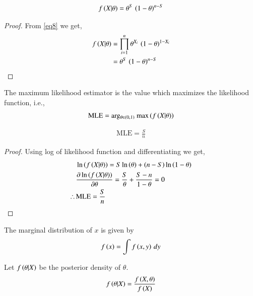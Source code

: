 \documentclass[journal,12pt,twocolumn]{IEEEtran}
\begin{document}
\begin{lemma}
\begin{align}
    f\left(X|\theta\right)=\theta^S\,\left(1-\theta\right)^{n-S}\label{eq7}
\end{align}
\end{lemma}

\begin{proof}
From \eqref{eq8} we get,
\begin{align}
    f\left(X|\theta\right) &= \prod_{i=1}^n\theta^{X_i}\,\left(1-\theta\right)^{1-X_i}\nonumber\\
    &=\theta^S\,\left(1-\theta\right)^{n-S}
\end{align}
\end{proof}

\begin{definition}
The maximum likelihood estimator is the value which maximizes the likelihood function, i.e.,
\begin{align}
    \text{MLE} = \text{arg$_{\theta \in (0,1)}$ max}\left(f\left(X|\theta\right)\right)
\end{align}
\end{definition}

\begin{lemma}
\begin{align}
    \text{MLE} = \frac{S}{n}
\end{align}
\end{lemma}

\begin{proof}
Using log of likelihood function and differentiating we get,
\begin{align}
    &\ln\left({f\left(X|\theta\right)}\right) = S\ln\left({\theta}\right) + \left(n-S\right)\ln\left({1-\theta}\right)\\
    &\frac{\partial \ln\left({f\left(X|\theta\right)}\right)}{\partial \theta} = \frac{S}{\theta} + \frac{S-n}{1-\theta} = 0 \nonumber\\
     \therefore\, &\text{MLE} = \frac{S}{n}
\end{align}
\end{proof}

\begin{definition}
The marginal distribution of $x$ is given by
\begin{align}
    f\left(x\right) = \int f\left(x,y\right)\,dy\label{eq9}
\end{align}
\end{definition}

\begin{definition}
Let $f\left(\theta|X\right)$ be the posterior density of $\theta$.
\begin{align}
    f\left(\theta|X\right) = \frac{f\left(X,\theta\right)}{f\left(X\right)}
\end{align}
\end{definition}
\end{document}
